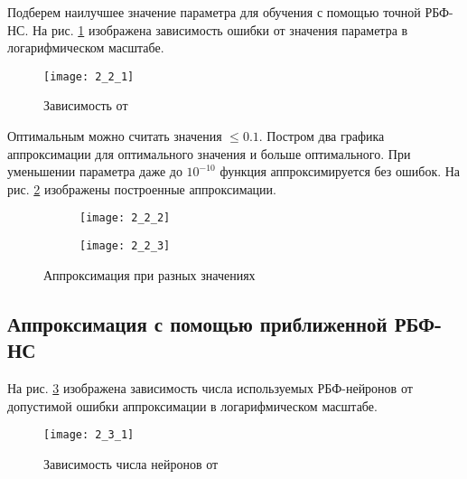 Подберем наилучшее значение параметра  для обучения с помощью точной РБФ-НС. На рис. \ref{fig:2_2_1} изображена зависимость ошибки  от значения параметра  в логарифмическом масштабе. 
\begin{figure}[H]
\begin{center}
	\texttt{[image: 2\_2\_1]}
	\caption{Зависимость  от }
	\label{fig:2_2_1}
\end{center}
\end{figure}

Оптимальным можно считать значения  $\leq 0.1$. Постром два графика аппроксимации для оптимального значения  и больше оптимального. При уменьшении параметра даже до $10^{-10}$ функция аппроксимируется без ошибок. На рис. \ref{fig:2_2_2} изображены построенные аппроксимации.
\begin{figure}[H]
\begin{center}
	\begin{subfigure}{0.49\textwidth}
		\texttt{[image: 2\_2\_2]}
		\caption{}
	\end{subfigure}
	\begin{subfigure}{0.49\textwidth}
		\texttt{[image: 2\_2\_3]}
		\caption{}
	\end{subfigure}
	\caption{Аппроксимация при разных значениях }
	\label{fig:2_2_2}
\end{center}
\end{figure}

\subsection{Аппроксимация с помощью приближенной РБФ-НС}


На рис. \ref{fig:2_3_1} изображена зависимость числа используемых РБФ-нейронов от допустимой ошибки аппроксимации  в логарифмическом масштабе.
\begin{figure}[H]
\begin{center}
	\texttt{[image: 2\_3\_1]}
	\caption{Зависимость числа нейронов от }
	\label{fig:2_3_1}
\end{center}
\end{figure}

